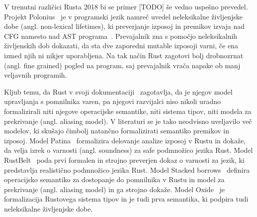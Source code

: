 V trenutni različici Rusta 2018 bi se primer [TODO] še vedno uspešno prevedel. Projekt Polonius~\cite{Matsakis_2018, Matsakis_et_al_2022} je v programski jezik namreč uvedel neleksikalne življenjske dobe (angl. non-lexical lifetimes), ki preverjanje izposoj in premikov izvaja nad CFG namesto nad AST programa~\cite{Oxide, StackedBorrows}. Prevajalnik zna s pomočjo neleksikalnih življenskih dob dokazati, da sta dve zaporedni mutable izposoji varni, če ena izmed njih ni nikjer uporabljena. Na tak način Rust zagotovi bolj drobnozrnat (angl. fine grained) pogled na program, saj prevajalnik vrača napake ob manj veljavnih programih.

Kljub temu, da Rust v svoji dokumentaciji~\cite{} zagotavlja, da je njegov model upravljanja s pomnilnika varen, pa njegovi razvijalci niso nikoli uradno formalizirali niti njegove operacijske semantike, niti sistema tipov, niti modela za prekrivanje (angl. aliasing model). V literaturi se je tako neodvisno uveljavilo več modelov, ki skušajo čimbolj natančno formalizirati semantiko premikov in izposoj. Model Patina~\cite{reed2015patina} formalizira delovanje analize izposoj v Rustu in dokaže, da velja izrek o varnosti (angl. soundness) za safe podmnožico jezika Rust. Model RustBelt~\cite{10.1145/3158154} poda prvi formalen in strojno preverjen dokaz o varnosti za jezik, ki predstavlja realistično podmnožico jezika Rust. Model Stacked borrows~\cite{StackedBorrows} definira operacijsko semantiko za dostopanje do pomnilnika v Rustu in model za prekrivanje (angl. aliasing model) in ga strojno dokaže. Model Oxide~\cite{Oxide} je formalizacija Rustovega sistema tipov in je tudi prva semantika, ki podpira tudi neleksikalne življenjske dobe. 